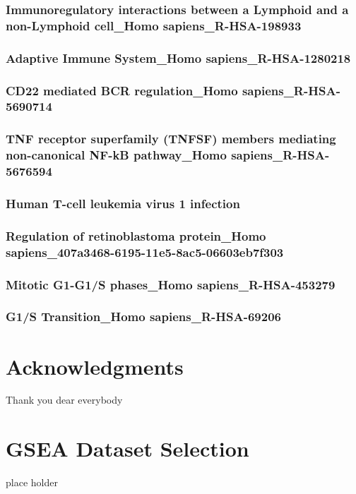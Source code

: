 \documentclass[3p,authoryear,preprint,12pt]{elsarticle}
\begin{document}
\subsubsection{Immunoregulatory interactions between a Lymphoid and a non-Lymphoid cell\_Homo sapiens\_R-HSA-198933}

\subsubsection{Adaptive Immune System\_Homo sapiens\_R-HSA-1280218}

\subsubsection{CD22 mediated BCR regulation\_Homo sapiens\_R-HSA-5690714}

\subsubsection{TNF receptor superfamily (TNFSF) members mediating non-canonical NF-kB pathway\_Homo sapiens\_R-HSA-5676594}

\subsubsection{Human T-cell leukemia virus 1 infection}

\subsubsection{Regulation of retinoblastoma protein\_Homo sapiens\_407a3468-6195-11e5-8ac5-06603eb7f303}

\subsubsection{Mitotic G1-G1/S phases\_Homo sapiens\_R-HSA-453279}

\subsubsection{G1/S Transition\_Homo sapiens\_R-HSA-69206}

\section*{Acknowledgments} Thank you dear everybody
\appendix

\section{GSEA Dataset Selection}\label{appendix-title-1f696b9ef905}
    place holder
\end{document}
